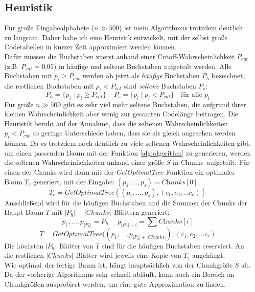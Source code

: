 \documentclass[a4paper,10pt,ngerman]{scrartcl}
\begin{document}
    \subsection{Heuristik}
    Für große Eingabealphabete ($n \gg 500$) ist mein Algorithmus trotzdem deutlich zu langsam.
    Daher habe ich eine Heuristik entwickelt, mit der selbst große Codetabellen in kurzer Zeit approximiert werden können. \\
    Dafür müssen die Buchstaben zuerst anhand einer Cutoff-Wahrscheinlichkeit $P_{cut}$ (z.B. $P_{cut} = 0.05$) in häufige und seltene Buchstaben aufgeteilt werden.
    Alle Buchstaben mit $p_i \ge P_{cut}$ werden ab jetzt als \textit{häufige} Buchstaben $P_h$ bezeichnet, die restlichen Buchstaben mit $p_i < P_{cut}$ sind \textit{seltene} Buchstaben $P_s$:
    \[P_{h} = \{p_i \mid p_i \ge P_{cut}\}~~~~~P_s = \{p_i \mid p_i < P_{cut}\} \text{~~~für alle $p_i$}\]
    Für große $n \gg 500$ gibt es sehr viel mehr seltene Buchstaben, die aufgrund ihrer kleinen Wahrscheinlichkeit aber wenig zur gesamten Codelänge beitragen.
    Die Heuristik beruht auf der Annahme, dass die seltenen Wahrscheinlichkeiten $p_i < P_{cut}$ so geringe Unterschiede haben, dass sie als gleich angesehen werden können.
    Da es trotzdem noch deutlich zu viele seltenen Wahrscheinlichkeiten gibt, um einen passenden Baum mit der Funktion \ref{alg:algorithm} zu generieren, werden die seltenen Wahrscheinlichkeiten anhand einer größe $S$ in \glqq Chunks\grqq~aufgeteilt.
    Für einen der Chunks wird dann mit der \textit{GetOptimalTree} Funktion ein optimaler Baum $T_c$ generiert, mit der Eingabe: $(p_1, \dots, p_s) = \textit{Chunks}[0]$.
    \[T_c = \textit{GetOptimalTree}((p_1, \dots, p_s), (c_1, c_2, \dots c_r))\]
    Anschließend wird für die häufigen Buchstaben und die Summen der Chunks der Haupt-Baum $T$ mit $|P_h| + |Chunks|$ Blättern generiert:
    \[p_1, \dots, p_{|P_h|} = P_h~~~~~~p_{|P_h| + i} = \sum \textit{Chunks}[i]\]
    \[T = \textit{GetOptimalTree}((p_1, \dots, p_{|P_h| + |Chunks|}), (c_1, c_2, \dots c_r)\]
    Die höchsten $|P_h|$ Blätter von $T$ sind für die häufigen Buchstaben \glqq reserviert\grqq.
    An die restlichen $|Chunks|$ Blätter wird jeweils eine Kopie von $T_c$ angehängt. \\
    Wie \glqq optimal\grqq~der fertige Baum ist, hängt hauptsächlich von der Chunkgröße $S$ ab.
    Da der vorherige Algorithmus sehr schnell abläuft, kann auch ein Bereich an Chunkgrößen ausprobiert werden, um eine gute Approximation zu finden.
\end{document}

